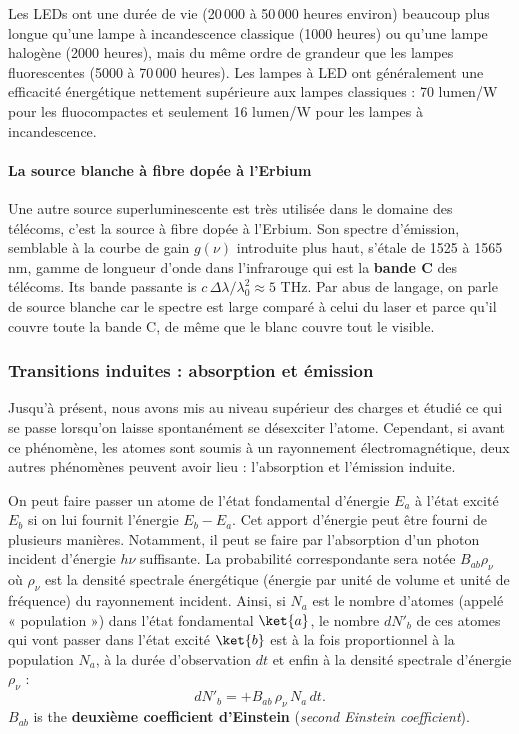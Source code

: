 Les LEDs ont une durée de vie (20\,000 à 50\,000 heures environ) beaucoup plus
longue qu'une lampe à incandescence classique (1000 heures) ou qu'une lampe
halogène (2000 heures), mais du même ordre de grandeur que les lampes
fluorescentes (5000 à 70\,000 heures). Les lampes à LED ont généralement une
efficacité énergétique nettement supérieure aux lampes classiques : 70 lumen/W
pour les fluocompactes et seulement 16 lumen/W pour les lampes à incandescence.

\paragraph{La source blanche à fibre dopée à l'Erbium}
Une autre source superluminescente est très utilisée dans le domaine des
télécoms, c'est la source à fibre dopée à l'Erbium. Son spectre d'émission,
semblable à la courbe de gain $g(\nu)$ introduite plus haut, s'étale de 1525 à
1565 nm, gamme de longueur d'onde dans l'infrarouge qui est la \textbf{bande C}
des télécoms. Its bande passante is $c\,\Delta\lambda/\lambda_0^2\approx 5$ THz.
Par abus de langage, on parle de source blanche car le spectre est large
comparé à celui du laser et parce qu'il couvre toute la bande C, de même que le
blanc couvre tout le visible.

\subsubsection{Transitions induites : absorption et émission}
Jusqu'à présent, nous avons mis au niveau supérieur des charges et étudié ce qui
se passe lorsqu'on laisse spontanément se désexciter l'atome. Cependant, si
avant ce phénomène, les atomes sont soumis à un rayonnement électromagnétique,
deux autres phénomènes peuvent avoir lieu : l'absorption et l'émission induite.

\begin{definition}[Absorption]
  On peut faire passer un atome de l'état fondamental d'énergie $E_a$ à l'état
  excité $E_b$ si on lui fournit l'énergie $E_b-E_a$. Cet apport d'énergie peut
  être fourni de plusieurs manières. Notamment, il peut se faire par
  l'absorption d'un photon incident d'énergie $h\nu$ suffisante. La probabilité
  correspondante sera notée $B_{ab}\rho_\nu$ où $\rho_\nu$ est la densité
  spectrale énergétique (énergie par unité de volume et unité de fréquence) du
  rayonnement incident. Ainsi, si $N_a$ est le nombre d'atomes (appelé
  « population ») dans l'état fondamental $\ket{a}$, le nombre $dN'_b$ de ces
  atomes qui vont passer dans l'état excité $\ket{b}$ est à la fois
  proportionnel à la population $N_a$, à la durée d'observation $dt$ et enfin à
  la densité spectrale d'énergie $\rho_\nu$ :
  \[dN'_b=+B_{ab}\,\rho_\nu\,N_a\,dt.\]
  $B_{ab}$ is the \textbf{deuxième coefficient d'Einstein} (\textit{second
  Einstein coefficient}).
\end{definition}

